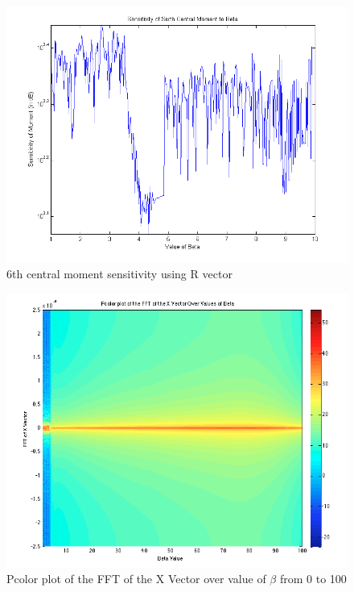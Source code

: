 \documentclass{article}[11pt]
\begin{document}
\begin{figure}[H]
\centering
\includegraphics[scale = 0.6]{images/RSensitivitySixth.png}
\caption{6th central moment sensitivity using R vector}
\label{fig:6thR}
\end{figure}
\begin{figure}[H]
\centering
\includegraphics[totalheight=0.4\textheight]{images/pcolor1.png}
\caption{Pcolor plot of the FFT of the X Vector over value of $\beta$ from 0 to 100}
\label{fig:pcolor1}
\end{figure}
\end{document}
